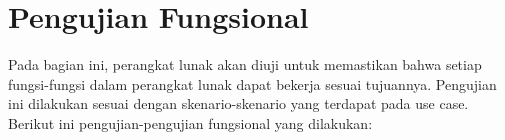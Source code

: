 
\section{Pengujian Fungsional}
Pada bagian ini, perangkat lunak akan diuji untuk memastikan bahwa setiap fungsi-fungsi dalam perangkat lunak dapat bekerja sesuai tujuannya. Pengujian ini dilakukan sesuai dengan skenario-skenario yang terdapat pada use case. Berikut ini pengujian-pengujian fungsional yang dilakukan:

